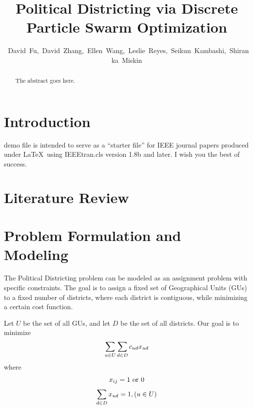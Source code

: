 \documentclass[journal]{IEEEtran}
\begin{document}
\title{Political Districting via Discrete Particle Swarm Optimization}
\author{~David~Fu,~David~Zhang,~Ellen~Wang,~Leslie~Reyes,~Seikun~Kambashi,~Shiranka~Miskin}
\maketitle

\begin{abstract}
The abstract goes here.
\end{abstract}

\section{Introduction}
 demo file is intended to serve as a ``starter file''
for IEEE journal papers produced under \LaTeX\ using
IEEEtran.cls version 1.8b and later.
I wish you the best of success.


\section{Literature Review}

\section{Problem Formulation and Modeling}
The Political Districting problem can be modeled as an assignment problem with specific constraints.  The goal is to assign a fixed set of Geographical Units (GUs) to a fixed number of districts, where each district is contiguous, while minimizing a certain cost function.  

Let $U$ be the set of all GUs, and let $D$ be the set of all districts.  Our goal is to minimize 
\begin{equation}
\sum_{u \in U} \sum_{d \in D} c_{ud} x_{ud}\\
\end{equation}
where
\begin{equation}
x_{ij} = 1 \text{ or } 0\\
\end{equation}
\begin{equation}
\sum_{d \in D} x_{ud} = 1, (u \in U)\\
\end{equation}
\end{document}
